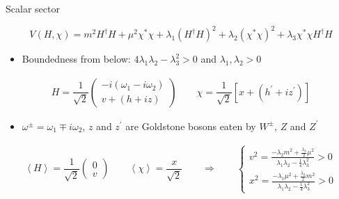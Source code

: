 \documentclass[10pt,xcolor=dvipsnames,mathserif]{beamer}
\newcommand{\mean}[1]{\left \langle #1 \right \rangle }
\begin{document}
\begin{frame}{Scalar sector}
	
    \begin{equation*}
    \label{eq:potential}
    V(H,\chi)= m^2 H^\dagger H + \mu^2 \chi^\ast \chi + \lambda_1 (H^\dagger H)^2 + \lambda_2 \left(\chi^\ast \chi\right)^2 + \lambda_3  \chi^\ast \chi H^\dagger H
    \end{equation*}
	\begin{itemize}
		 \item Boundedness from below: $4 \lambda_1 \lambda_2 - \lambda_3^2 >0$ and $\lambda_1,\lambda_2 > 0$
	\end{itemize}
		
	\begin{equation*}
	\begin{aligned}
	 H = \dfrac{1}{\sqrt{2}} 
		\begin{pmatrix}
		-i \left(\omega_1 - i \omega_2 \right) \\
		v + (h + i z)
		\end{pmatrix}	
		\qquad
		\chi = \dfrac{1}{\sqrt{2}} \left[ x + \left(h^\prime + i z^\prime\right) \right]	
	\end{aligned}
	\end{equation*}	

    \begin{itemize}
    	\item $\omega^\pm = \omega_1 \mp i \omega_2$, $z$ and $z^\prime$ are Goldstone bosons eaten by $W^\pm$, $Z$ and $Z^\prime$
    \end{itemize}		
    
    \begin{equation*}
    \begin{aligned}
    \mean{H} = \dfrac{1}{\sqrt{2}} 
    \begin{pmatrix}
    0 \\
    v 
    \end{pmatrix}	
    \qquad
    \mean{\chi} = \dfrac{x}{\sqrt{2}}
    \qquad \Rightarrow \qquad
    \begin{cases}
    v^2 = \tfrac{-\lambda_2 m^2 + \tfrac{\lambda_3}{2}\mu^2}{\lambda_1 \lambda_2 - \tfrac{1}{4}\lambda_3^2} > 0 \\
    x^2 = \tfrac{-\lambda_1 \mu^2 + \tfrac{\lambda_3}{2}m^2}{\lambda_1 \lambda_2 - \tfrac{1}{4}\lambda_3^2} > 0
    \end{cases}	
    \end{aligned}
    \end{equation*}			
    
    \end{frame}
    
\end{document}
